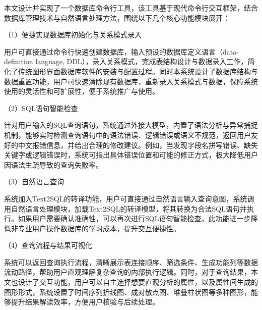 \begin{CJK*}{UTF8}{song}

本文设计并实现了一个数据库命令行工具，该工具基于现代命令行交互框架，结合数据库管理技术与自然语言处理方法，围绕以下几个核心功能模块展开：

（1）便捷实现数据库初始化与关系模式录入

用户可直接通过命令行快速创建数据库，输入预设的数据库定义语言（data-definition language, DDL），录入关系模式，完成表结构设计与数据录入工作，简化了传统图形界面数据库软件的安装与配置过程。同时本系统设计了数据库结构与数据重置功能，用户可快速清除现有数据库，重新录入关系模式与数据，保障系统使用的灵活性和可扩展性，便于系统推广与使用。

（2）SQL语句智能检查

针对用户输入的SQL查询语句，系统通过外接大模型，内置了语法分析与异常捕捉机制，能够实时检测查询语句中的语法错误、逻辑错误或语义不规范，返回用户友好的中文报错信息，并给出合理的修改建议。例如，当发现字段名拼写错误、缺失关键字或逻辑错误时，系统可指出具体错误位置和可能的修正方式，极大降低用户因语法生疏导致的查询失败率。

（3）自然语言查询

系统加入Text2SQL的转译功能，用户可直接通过自然语言输入查询意图，系统调用自然语言处理模块，加载Text2SQL的转译模型，将其转换为合法SQL语句并执行。如果用户需要确认准确性，可以再次进行SQL语句智能检查。此功能进一步降低非专业用户操作数据库的学习成本，提升交互便捷性。

（4）查询流程与结果可视化

系统可以返回查询执行流程，清晰展示表连接顺序、筛选条件、生成功能列等数据流动路径，帮助用户直观理解复杂查询的内部执行逻辑。同时，对于查询结果，本文也设计了交互功能，用户可以自主选择想要直观分析的属性，以及属性间生成的图形形式，系统设置了时间序列折线图、成对散点图、堆叠柱状图等多种图形，能够提升结果解读效率，方便用户核验与后续处理。

\end{CJK*}